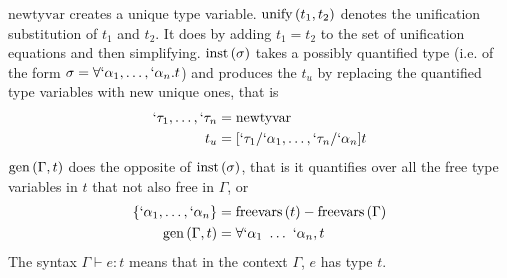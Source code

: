 \documentclass[12pt]{article}
\newcommand{\newtyvar}{\mathrm{newtyvar}}
\newcommand{\inst}[1]{\mathrm{inst}\del{#1}}
\newcommand{\gen}[2]{\mathrm{gen}\del{#1, #2}}
\newcommand{\freevars}[1]{\mathrm{freevars}\del{#1}}
\newcommand{\unify}[2]{\mathrm{unify}\del{#1, #2}}
\begin{document}
$\newtyvar$ creates a unique type variable.
$\unify{t_1}{t_2}$ denotes the unification substitution of $t_1$ and
$t_2$.
It does by adding $t_1 = t_2$ to the set of unification equations and
then simplifying.
$\inst{\sigma}$ takes a possibly quantified type (i.e. of the form
$\sigma = \forall `\alpha_1, \ldots, `\alpha_n. t$) and produces the
$t_u$ by replacing the
quantified type variables with new unique ones, that is
\begin{align*}
  `\tau_1,\ldots,`\tau_n &= \newtyvar\\
  t_u &= [`\tau_1/`\alpha_1, \ldots, `\tau_n/`\alpha_n] t
\end{align*}
$\gen{\Gamma}{t}$ does the opposite of $\inst{\sigma}$, that is it
quantifies over all the free type variables in $t$ that not also free
in $\Gamma$, or
\begin{align*}
  \cbr{`\alpha_1, \ldots, `\alpha_n} &= \freevars{t} - \freevars{\Gamma}\\
  \gen{\Gamma}{t} &= \forall `\alpha_1~\ldots~`\alpha_n, t
\end{align*}
The syntax $\Gamma \vdash e : t$ means that in the context
$\Gamma$, $e$ has type $t$.
\end{document}
